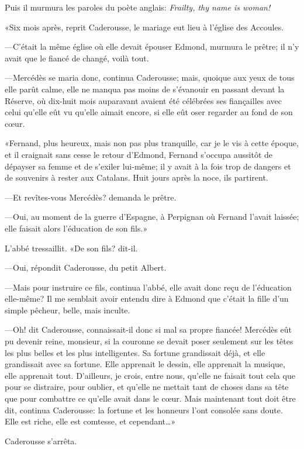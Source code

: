 Puis il murmura les paroles du poète anglais: \textit{Frailty, thy name is woman!}

«Six mois après, reprit Caderousse, le mariage eut lieu à l'église des Accoules.

—C'était la même église où elle devait épouser Edmond, murmura le prêtre; il n'y avait que le fiancé de changé, voilà tout.

—Mercédès se maria donc, continua Caderousse; mais, quoique aux yeux de tous elle parût calme, elle ne manqua pas moins de s'évanouir en passant devant la Réserve, où dix-huit mois auparavant avaient été célébrées ses fiançailles avec celui qu'elle eût vu qu'elle aimait encore, si elle eût oser regarder au fond de son cœur.

«Fernand, plus heureux, mais non pas plus tranquille, car je le vis à cette époque, et il craignait sans cesse le retour d'Edmond, Fernand s'occupa aussitôt de dépayser sa femme et de s'exiler lui-même; il y avait à la fois trop de dangers et de souvenirs à rester aux Catalans. Huit jours après la noce, ils partirent.

—Et revîtes-vous Mercédès? demanda le prêtre.

—Oui, au moment de la guerre d'Espagne, à Perpignan où Fernand l'avait laissée; elle faisait alors l'éducation de son fils.»

L'abbé tressaillit. «De son fils? dit-il.

—Oui, répondit Caderousse, du petit Albert.

—Mais pour instruire ce fils, continua l'abbé, elle avait donc reçu de l'éducation elle-même? Il me semblait avoir entendu dire à Edmond que c'était la fille d'un simple pêcheur, belle, mais inculte.

—Oh! dit Caderousse, connaissait-il donc si mal sa propre fiancée! Mercédès eût pu devenir reine, monsieur, si la couronne se devait poser seulement sur les têtes les plus belles et les plus intelligentes. Sa fortune grandissait déjà, et elle grandissait avec sa fortune. Elle apprenait le dessin, elle apprenait la musique, elle apprenait tout. D'ailleurs, je crois, entre nous, qu'elle ne faisait tout cela que pour se distraire, pour oublier, et qu'elle ne mettait tant de choses dans sa tête que pour combattre ce qu'elle avait dans le cœur. Mais maintenant tout doit être dit, continua Caderousse: la fortune et les honneurs l'ont consolée sans doute. Elle est riche, elle est comtesse, et cependant\dots»

Caderousse s'arrêta.

